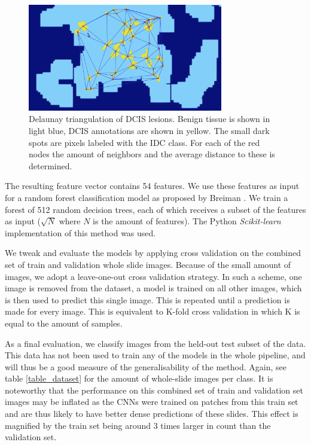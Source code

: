 \documentclass[journal]{IEEEtran}
\begin{document}
\begin{figure}[!t]
\centering{}
\includegraphics[width=3.35in]{feature_delaunay}
\vspace{-0.15cm}\caption{Delaunay triangulation of DCIS lesions. Benign tissue is shown in light blue, DCIS annotations are shown in yellow. The small dark spots are pixels labeled with the IDC class. For each of the red nodes the amount of neighbors and the average distance to these is determined.}
\label{fig_delaunay}
\end{figure}

The resulting feature vector contains 54 features. We use these features as input for a random forest classification model as proposed by Breiman \cite{breiman2001random}. We train a forest of 512 random decision trees, each of which receives a subset of the features as input ($\sqrt{N}$ where $N$ is the amount of features). The Python \emph{Scikit-learn} implementation of this method was used\cite{scikit-learn}.

\bigskip

We tweak and evaluate the models by applying cross validation on the combined set of train and validation whole slide images. Because of the small amount of images, we adopt a leave-one-out cross validation strategy. In such a scheme,  one image is removed from the dataset, a model is trained on all other images, which is then used to predict this single image. This is repeated until a prediction is made for every image.  This is equivalent to K-fold cross validation in which K is equal to the amount of samples.

As a final evaluation, we classify images from the held-out test subset of the data. This data has not been used to train any of the models in the whole pipeline, and will thus be a good measure of the generalisability of the method. Again, see table \ref{table_dataset} for the amount of whole-slide images per class. It is noteworthy that the performance on this combined set of train and validation set images may be inflated as the CNNs were trained on patches from this train set and are thus likely to have better dense predictions of these slides. This effect is magnified by the train set being around 3 times larger in count than the validation set.
\end{document}
